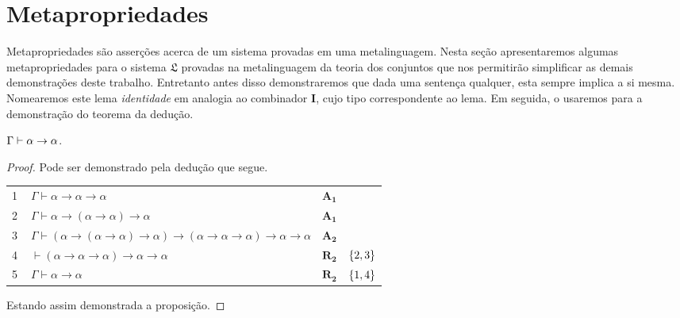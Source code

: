 \section{Metapropriedades}
    Metapropriedades são asserções acerca de um sistema provadas em uma metalinguagem.
    Nesta seção apresentaremos algumas metapropriedades para o sistema $\mathfrak{L}$ provadas na metalinguagem da teoria dos conjuntos que nos permitirão simplificar as demais demonstrações deste trabalho.
    Entretanto antes disso demonstraremos que dada uma sentença qualquer, esta sempre implica a si mesma.
    Nomearemos este lema \emph{identidade} em analogia ao combinador $\mathbf{I}$, cujo tipo correspondente ao lema.
    Em seguida, o usaremos para a demonstração do teorema da dedução.
    \vspace{.5\baselineskip}
    \begin{tcolorbox}[enhanced jigsaw, breakable, sharp corners, colframe=black, colback=white, boxrule=0.5pt, left=1.5mm, right=1.5mm, top=1.5mm, bottom=1.5mm]
    \begin{lemma}[Identidade]\label{identity}
        $\Gamma\mathrel{\vdash}\alpha\to\alpha$.
        \begin{proof}
            Pode ser demonstrado pela dedução que segue.

            \vspace{0.5\baselineskip}
            \footnotesize
            \newlength{\rowskip}
            \setlength{\rowskip}{0.5\baselineskip}
            \begin{xltabular}{\textwidth}{r | X l l}
                \scriptsize{\phantom{0}1}\phantom{ } & $\ \Gamma\vdash\alpha\to\alpha\to\alpha$                                                              & \hyperref[modal.axiom.1]{$\mathbf{A_1}$}           & \\[\rowskip]
                \scriptsize{\phantom{0}2}\phantom{ } & $\ \Gamma\vdash\alpha\to(\alpha\to\alpha)\to\alpha$                                                   & \hyperref[modal.axiom.1]{$\mathbf{A_1}$}           & \\[\rowskip]
                \scriptsize{\phantom{0}3}\phantom{ } & $\ \Gamma\vdash(\alpha\to(\alpha\to\alpha)\to\alpha)\to(\alpha\to\alpha\to\alpha)\to\alpha\to\alpha$  & \hyperref[modal.axiom.1]{$\mathbf{A_2}$}           & \\[\rowskip]
                \scriptsize{\phantom{0}4}\phantom{ } & $\ \vdash(\alpha\to\alpha\to\alpha)\to\alpha\to\alpha$                                                & $\hyperref[modal.rule.2]{\mathbf{R_2}}$            & $\left\{2,3\right\}$\\[\rowskip]
                \scriptsize{\phantom{0}5}\phantom{ } & $\ \Gamma\vdash\alpha\to\alpha$                                                                       & $\hyperref[modal.rule.2]{\mathbf{R_2}}$\phantom{1} & $\left\{1,4\right\}$
            \end{xltabular}
            \normalsize

            \vspace{.5\baselineskip}
            Estando assim demonstrada a proposição.
        \end{proof}
    \end{lemma}
    \end{tcolorbox}
